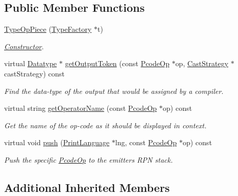 \subsection*{Public Member Functions}
\begin{DoxyCompactItemize}
\item 
\mbox{\hyperlink{class_type_op_piece_a05462b2fbb4a3a2097fb3c7f73213170}{Type\+Op\+Piece}} (\mbox{\hyperlink{class_type_factory}{Type\+Factory}} $\ast$t)
\begin{DoxyCompactList}\small\item\em \mbox{\hyperlink{class_constructor}{Constructor}}. \end{DoxyCompactList}\item 
virtual \mbox{\hyperlink{class_datatype}{Datatype}} $\ast$ \mbox{\hyperlink{class_type_op_piece_a951c2e42be991699b04945bb1c71de04}{get\+Output\+Token}} (const \mbox{\hyperlink{class_pcode_op}{Pcode\+Op}} $\ast$op, \mbox{\hyperlink{class_cast_strategy}{Cast\+Strategy}} $\ast$cast\+Strategy) const
\begin{DoxyCompactList}\small\item\em Find the data-\/type of the output that would be assigned by a compiler. \end{DoxyCompactList}\item 
virtual string \mbox{\hyperlink{class_type_op_piece_aa4d66f5b3abf4ea297a0aa083aab2476}{get\+Operator\+Name}} (const \mbox{\hyperlink{class_pcode_op}{Pcode\+Op}} $\ast$op) const
\begin{DoxyCompactList}\small\item\em Get the name of the op-\/code as it should be displayed in context. \end{DoxyCompactList}\item 
virtual void \mbox{\hyperlink{class_type_op_piece_a24c1187d1edbbd41aba854715f6c02fe}{push}} (\mbox{\hyperlink{class_print_language}{Print\+Language}} $\ast$lng, const \mbox{\hyperlink{class_pcode_op}{Pcode\+Op}} $\ast$op) const
\begin{DoxyCompactList}\small\item\em Push the specific \mbox{\hyperlink{class_pcode_op}{Pcode\+Op}} to the emitter\textquotesingle{}s R\+PN stack. \end{DoxyCompactList}\end{DoxyCompactItemize}
\subsection*{Additional Inherited Members}


